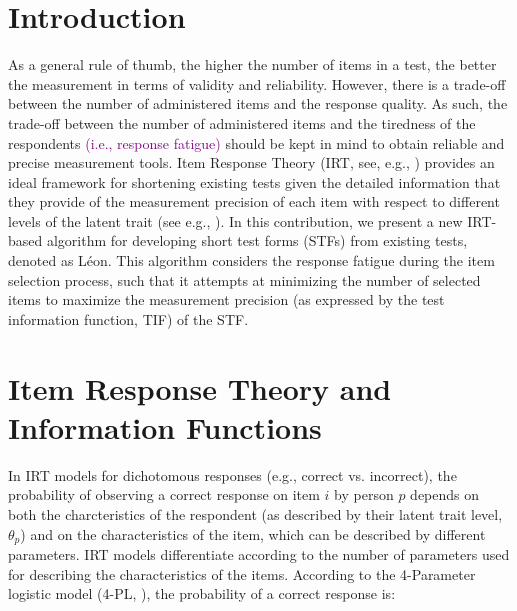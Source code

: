 \documentclass{svproc}
\newcommand{\ottavia}[1]{\textcolor{purple}{#1}}
\begin{document}
\section{Introduction}
%
As a general rule of thumb, the higher the number of items in a test, the better the measurement in terms of validity and reliability. However, there is a trade-off between the number of administered items and the response quality. As such, the trade-off between the number of administered items and the tiredness of the respondents \ottavia{(i.e., response fatigue)} should be kept in mind to obtain reliable and precise measurement tools. Item Response Theory (IRT, see, e.g., \cite{baker}) provides an ideal framework for shortening existing tests given the detailed information that they provide of the measurement precision of each item with respect to different levels of the latent trait (see e.g., \cite{pauci}). 
In this contribution, we present a new IRT-based algorithm for developing short test forms (STFs) from existing tests, denoted as Léon. This algorithm considers the response fatigue during the item selection process, such that it attempts at minimizing the number of selected items to maximize the measurement precision (as expressed by the test information function, TIF) of the STF.

\section{Item Response Theory and Information Functions}  

In IRT models for dichotomous responses (e.g., correct vs. incorrect), the probability of observing a correct response on item $i$ by person $p$ depends on both the charcteristics of the respondent (as described by their latent trait level, $\theta_p$) and on the characteristics of the item, which can be described by different parameters. IRT models differentiate according to the number of parameters used for describing the characteristics of the items. According to the 4-Parameter logistic model (4-PL, \cite{barton:4pl}), the probability of a correct response is: 
\end{document}
